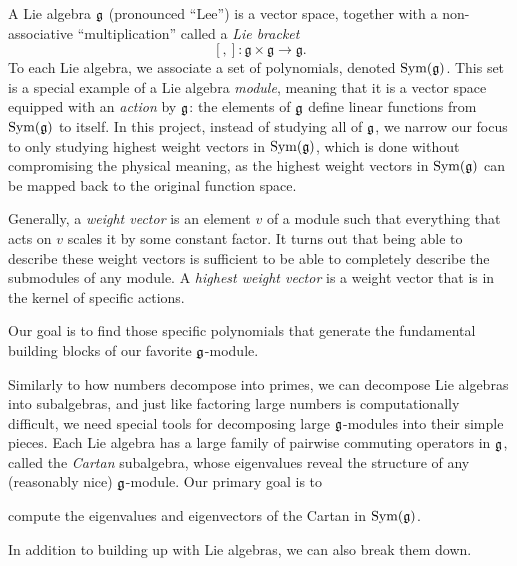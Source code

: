 \documentclass[11pt, reqno]{amsart}
\begin{document}
A Lie algebra $\mathfrak{g}$ (pronounced ``Lee'') is a vector space, together with a non-associative ``multiplication'' called a \emph{Lie bracket}
\[[,]: \mathfrak{g} \times \mathfrak{g} \rightarrow \mathfrak{g}.\]
To each Lie algebra, we associate a set of polynomials, denoted $\operatorname{Sym}(\mathfrak{g})$. This set is a special example of a Lie algebra \emph{module}, meaning that it is a vector space equipped with an \emph{action} by $\mathfrak{g}$: the elements of $\mathfrak{g}$ define linear functions from $\operatorname{Sym}(\mathfrak{g})$ to itself. In this project, instead of studying all of $\mathfrak{g}$, we narrow our focus to only studying highest weight vectors in $\operatorname{Sym}(\mathfrak{g})$, which is done without compromising the physical meaning, as the highest weight vectors in $\operatorname{Sym}(\mathfrak{g})$ can be mapped back to the original function space.

Generally, a \emph{weight vector} is an element $v$ of a module such that everything that acts on $v$ scales it by some constant factor. It turns out that being able to describe these weight vectors is sufficient to be able to completely describe the submodules of any module. A \emph{highest weight vector} is a weight vector that is in the kernel of specific actions.

Our goal is to find those specific polynomials that generate the fundamental building blocks of our favorite $\mathfrak{g}$-module. 

Similarly to how numbers decompose into primes, we can decompose Lie algebras into subalgebras, and just like factoring large numbers is computationally difficult, we need special tools for decomposing large $\mathfrak{g}$-modules into their simple pieces. Each Lie algebra has a large family of pairwise commuting operators in $\mathfrak{g}$, called the \emph{Cartan} subalgebra, whose eigenvalues reveal the structure of any (reasonably nice) $\mathfrak{g}$-module. Our primary goal is to
\begin{center} compute the eigenvalues and eigenvectors of the Cartan in $\operatorname{Sym}(\mathfrak{g})$. \end{center}


In addition to building up with Lie algebras, we can also break them down.

%
%
%
%
\end{document}
